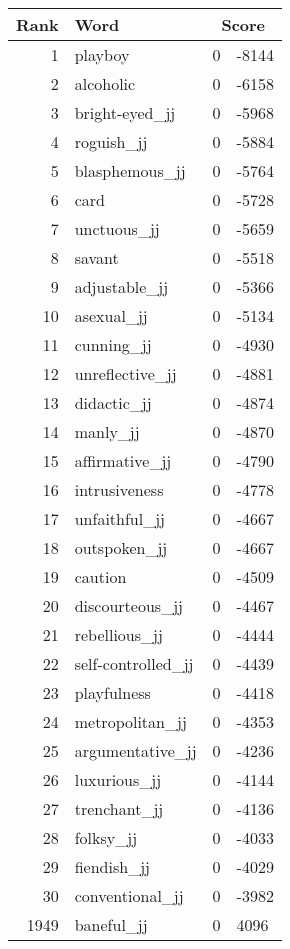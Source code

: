\begin{longtable}[!htbp]{| rlr@{.}l |}
    \hline
    \textbf{Rank} & \textbf{Word} & \multicolumn{2}{c|}{\textbf{Score}} \\
    \hline
    \endhead
    1 & playboy & 0 & -8144 \\
    2 & alcoholic & 0 & -6158 \\
    3 & bright-eyed\_jj & 0 & -5968 \\
    4 & roguish\_jj & 0 & -5884 \\
    5 & blasphemous\_jj & 0 & -5764 \\
    6 & card & 0 & -5728 \\
    7 & unctuous\_jj & 0 & -5659 \\
    8 & savant & 0 & -5518 \\
    9 & adjustable\_jj & 0 & -5366 \\
    10 & asexual\_jj & 0 & -5134 \\
    11 & cunning\_jj & 0 & -4930 \\
    12 & unreflective\_jj & 0 & -4881 \\
    13 & didactic\_jj & 0 & -4874 \\
    14 & manly\_jj & 0 & -4870 \\
    15 & affirmative\_jj & 0 & -4790 \\
    16 & intrusiveness & 0 & -4778 \\
    17 & unfaithful\_jj & 0 & -4667 \\
    18 & outspoken\_jj & 0 & -4667 \\
    19 & caution & 0 & -4509 \\
    20 & discourteous\_jj & 0 & -4467 \\
    21 & rebellious\_jj & 0 & -4444 \\
    22 & self-controlled\_jj & 0 & -4439 \\
    23 & playfulness & 0 & -4418 \\
    24 & metropolitan\_jj & 0 & -4353 \\
    25 & argumentative\_jj & 0 & -4236 \\
    26 & luxurious\_jj & 0 & -4144 \\
    27 & trenchant\_jj & 0 & -4136 \\
    28 & folksy\_jj & 0 & -4033 \\
    29 & fiendish\_jj & 0 & -4029 \\
    30 & conventional\_jj & 0 & -3982 \\
    1949 & baneful\_jj & 0 & 4096 \\

\end{longtable}
